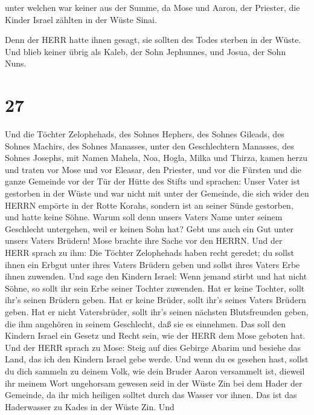  unter welchen war keiner aus der Summe, da Mose und Aaron,
der Priester, die Kinder Israel zählten in der Wüste Sinai.

 Denn der HERR hatte ihnen gesagt, sie sollten des Todes
sterben in der Wüste. Und blieb keiner übrig als Kaleb, der Sohn
Jephunnes, und Josua, der Sohn Nuns.

\hypertarget{section-26}{%
\section{27}\label{section-26}}

 Und die Töchter Zelophehads, des Sohnes Hephers, des Sohnes
Gileads, des Sohnes Machirs, des Sohnes Manasses, unter den
Geschlechtern Manasses, des Sohnes Josephs, mit Namen Mahela, Noa,
Hogla, Milka und Thirza, kamen herzu  und traten vor Mose
und vor Eleasar, den Priester, und vor die Fürsten und die ganze
Gemeinde vor der Tür der Hütte des Stifts und sprachen: 
Unser Vater ist gestorben in der Wüste und war nicht mit unter der
Gemeinde, die sich wider den HERRN empörte in der Rotte Korahs, sondern
ist an seiner Sünde gestorben, und hatte keine Söhne.  Warum
soll denn unsers Vaters Name unter seinem Geschlecht untergehen, weil er
keinen Sohn hat? Gebt uns auch ein Gut unter unsers Vaters Brüdern!
 Mose brachte ihre Sache vor den HERRN.  Und der
HERR sprach zu ihm:  Die Töchter Zelophehads haben recht
geredet; du sollst ihnen ein Erbgut unter ihres Vaters Brüdern geben und
sollst ihres Vaters Erbe ihnen zuwenden.  Und sage den
Kindern Israel: Wenn jemand stirbt und hat nicht Söhne, so sollt ihr
sein Erbe seiner Tochter zuwenden.  Hat er keine Tochter,
sollt ihr's seinen Brüdern geben.  Hat er keine Brüder,
sollt ihr's seines Vaters Brüdern geben.  Hat er nicht
Vatersbrüder, sollt ihr's seinen nächsten Blutsfreunden geben, die ihm
angehören in seinem Geschlecht, daß sie es einnehmen. Das soll den
Kindern Israel ein Gesetz und Recht sein, wie der HERR dem Mose geboten
hat.  Und der HERR sprach zu Mose: Steig auf dies Gebirge
Abarim und besiehe das Land, das ich den Kindern Israel gebe werde.
 Und wenn du es gesehen hast, sollst du dich sammeln zu
deinem Volk, wie dein Bruder Aaron versammelt ist,  dieweil
ihr meinem Wort ungehorsam gewesen seid in der Wüste Zin bei dem Hader
der Gemeinde, da ihr mich heiligen solltet durch das Wasser vor ihnen.
Das ist das Haderwasser zu Kades in der Wüste Zin.  Und
